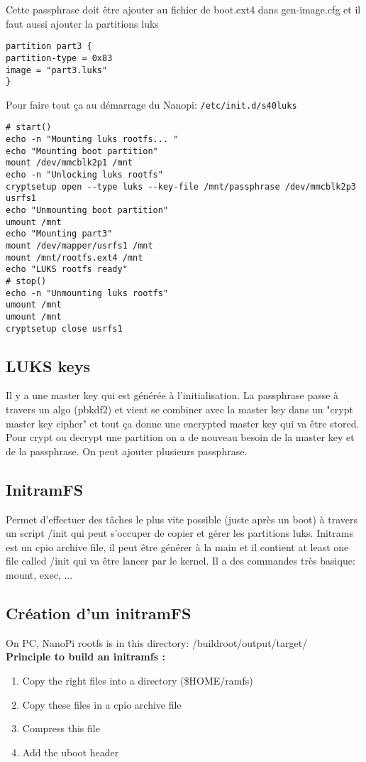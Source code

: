 Cette passphrase doit être ajouter au fichier de boot.ext4 dans gen-image.cfg et il faut aussi ajouter la partitions luks
\begin{lstlisting}[style=bash]
partition part3 {
partition-type = 0x83
image = "part3.luks"
}
\end{lstlisting}
Pour faire tout ça au démarrage du Nanopi: \verb!/etc/init.d/s40luks!
\begin{lstlisting}[style=bash]
# start()
echo -n "Mounting luks rootfs... "
echo "Mounting boot partition"
mount /dev/mmcblk2p1 /mnt
echo -n "Unlocking luks rootfs"
cryptsetup open --type luks --key-file /mnt/passphrase /dev/mmcblk2p3
usrfs1
echo "Unmounting boot partition"
umount /mnt
echo "Mounting part3"
mount /dev/mapper/usrfs1 /mnt
mount /mnt/rootfs.ext4 /mnt
echo "LUKS rootfs ready"
# stop()
echo -n "Unmounting luks rootfs"
umount /mnt
umount /mnt
cryptsetup close usrfs1
\end{lstlisting}
\subsection{LUKS keys}
Il y a une master key qui est générée à l'initialisation. La passphrase passe à travers un algo (pbkdf2) et vient se combiner avec la master key dans un "crypt master key cipher" et tout ça donne une encrypted master key qui va être stored. Pour crypt ou decrypt une partition on a de nouveau besoin de la master key et de la passphrase. On peut ajouter plusieurs passphrase.

\subsection{InitramFS}
Permet d'effectuer des tâches le plus vite possible (juste après un boot) à travers un script /init qui peut s'occuper de copier et gérer les partitions luks. Initrams est un cpio archive file, il peut être générer à la main et il contient at least one file called /init qui va être lancer par le kernel. Il a des commandes très basique: mount, exec, ...

\subsection{Création d'un initramFS}
On PC, NanoPi rootfs is in this directory: /buildroot/output/target/\\
\textbf{Principle to build an initramfs :}
\begin{enumerate}
\item Copy the right files into a directory (\$HOME/ramfs)
\item Copy these files in a cpio archive file
\item Compress this file
\item Add the uboot header
\end{enumerate}

